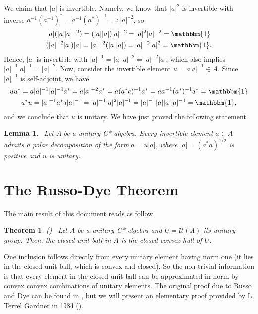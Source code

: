\documentclass[12pt,english]{article}
\newtheorem{theorem}{Theorem}[section]
\newtheorem*{lemma*}{Lemma}
\theoremstyle{definition}
\theoremstyle{remark}
\begin{document}
We claim that $|a|$ is invertible. Namely, we know that $|a|^2$ is invertible with inverse $a^{-1}(a^{-1})^*=a^{-1}(a^*)^{-1}=:|a|^{-2}$, so
\begin{gather*}
|a|(|a||a|^{-2})=(|a||a|)|a|^{-2}=|a|^2|a|^{-2}=\mathbbm{1}\\
(|a|^{-2}|a|)|a|=|a|^{-2}(|a||a|)=|a|^{-2}|a|^2=\mathbbm{1}.
\end{gather*}
Hence, $|a|$ is invertible with $|a|^{-1}=|a||a|^{-2}=|a|^{-2}|a|$, which also implies $|a|^{-1}|a|^{-1}=|a|^{-2}$. Now, consider the invertible element $u=a|a|^{-1}\in A$. Since $|a|^{-1}$ is self-adjoint, we have
\begin{gather*}
uu^*=a|a|^{-1}|a|^{-1}a^*=a|a|^{-2}a^*=a(a^*a)^{-1}a^*=aa^{-1}(a^*)^{-1}a^*=\mathbbm{1}\\
u^*u=|a|^{-1}a^*a|a|^{-1}=|a|^{-1}|a|^2|a|^{-1}=|a|^{-1}|a||a||a|^{-1}=\mathbbm{1},
\end{gather*}
and we conclude that $u$ is unitary. We have just proved the following statement.
\begin{lemma*} \label{lm:polar decomposition} \ 
	Let $A$ be a unitary C*-algebra. Every invertible element $a\in A$ admits a \emph{polar decomposition} of the form $a=u|a|$, where $|a|=(a^*a)^{1/2}$ is positive and $u$ is unitary.
\end{lemma*}

\section{The Russo-Dye Theorem}

The main result of this document reads as follow.

\begin{theorem} \label{thm:russo-dye} {\normalfont (\cite[Theorem 1]{russo-dye})} \ 
	Let $A$ be a unitary C*-algebra and $U=\mathcal{U}(A)$ its unitary group. Then, the closed unit ball in $A$ is the closed convex hull of $U$.
\end{theorem}

One inclusion follows directly from every unitary element having norm one (it lies in the closed unit ball, which is convex and closed). So the non-trivial information is that every element in the closed unit ball can be approximated in norm by convex convex combinations of unitary elements. The original proof due to Russo and Dye can be found in \cite{russo-dye}, but we will present an elementary proof provided by L. Terrel Gardner in 1984 (\cite{gardner}).
\end{document}
